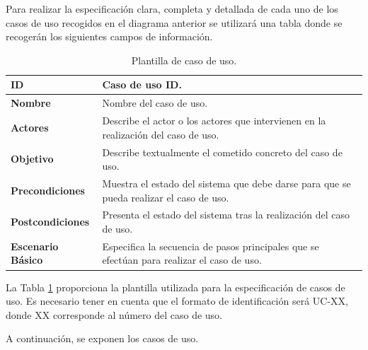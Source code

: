 Para realizar la especificación clara, completa y detallada de cada uno de los casos de uso recogidos en el diagrama anterior se utilizará una tabla donde se recogerán los siguientes campos de información.

\begin{center}
\begin{table}[htbp]
\centering
\caption{Plantilla de caso de uso.}
\begin{tabular}{@{}p{2.5cm} p{9cm}@{}} 
\toprule
\textbf{ID}	& Caso de uso ID.  \\
\midrule
\textbf{Nombre} 		& Nombre del caso de uso.   \\
\midrule
\textbf{Actores} 		&	Describe el actor o los actores que intervienen en la realización del caso de uso.  \\
\midrule
\textbf{Objetivo} 	&	Describe textualmente el cometido concreto del caso de uso. 	 \\
\midrule
\textbf{Precondiciones}	&	Muestra el estado del sistema que debe darse para que se pueda realizar el caso de uso.   \\
\midrule
\textbf{Postcondiciones} 	&	Presenta el estado del sistema tras la realización del caso de uso.   \\
\midrule
\textbf{Escenario Básico} 	&  Especifica la secuencia de pasos principales que se efectúan para realizar el caso de uso. \\
\bottomrule
\end{tabular}
\label{tab:uc_template}
\end{table}
\end{center}

La Tabla \ref{tab:uc_template} proporciona la plantilla utilizada para la especificación de casos de uso. Es necesario tener en cuenta que el formato de identificación será UC-XX, donde XX corresponde al número del caso de uso. 

A continuación, se exponen los casos de uso.

